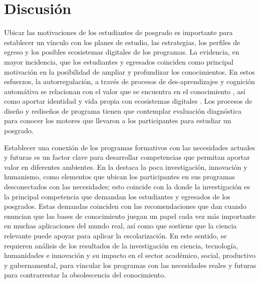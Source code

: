 \documentclass[spanish]{textolivre}
\begin{document}
\section{Discusión}\label{sec-secoes}
Ubicar las motivaciones de los estudiantes de posgrado es importante para establecer un vínculo con los planes de estudio, las estrategias, los perfiles de egreso y los posibles ecosistemas digitales de los programas. La  evidencia, en mayor incidencia, que los estudiantes y egresados coinciden como principal motivación en la posibilidad de ampliar y profundizar los conocimientos. En estos esfuerzos, la autorregulación, a través de procesos de des-aprendizajes y cognición automátiva se relacionan con el valor que se encuentra en el conocimiento \cite{helfrich_how_2018}, así como aportar identidad y vida propia con ecosistemas digitales \cite{islas_ecosistemas_2017}. Los procesos de diseño y rediseños de programa tienen que contemplar evaluación diagnóstica para conocer los motores que llevaron a los participantes para estudiar un posgrado.

Establecer una conexión de los programas formativos con las necesidades actuales y futuras es un factor clave para desarrollar competencias que permitan aportar valor en diferentes ambientes. En la  destaca la poca investigación, innovación y humanismo, como elementos que ubican los participantes en sus programas desconectados con las necesidades; esto coincide con la  donde la investigación es la principal competencia que demandan los estudiantes y egresados de los posgrados. Estas demandas coinciden con las recomendaciones que dan \textcite{liang_how_2017} cuando enuncian que las bases de conocimiento juegan un papel cada vez más importante en muchas aplicaciones del mundo real, así como \textcite{dorsch_issue_2018} que sostiene que la ciencia relevante puede apoyar para aplicar la escolarización. En este sentido, se requieren análisis de los resultados de la investigación en ciencia, tecnología, humanidades e innovación y su impacto en el sector académico, social, productivo y gubernamental, para vincular los programas con las necesidades reales y futuras para contrarrestar la obsolescencia del conocimiento.
\end{document}
